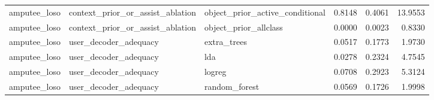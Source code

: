 \begin{table}[!t]
\begin{tabular}{lllrrr}
amputee\_loso & context\_prior\_or\_assist\_ablation & object\_prior\_active\_conditional & 0.8148 & 0.4061 & 13.9553 \\
amputee\_loso & context\_prior\_or\_assist\_ablation & object\_prior\_allclass & 0.0000 & 0.0023 & 0.8330 \\
amputee\_loso & user\_decoder\_adequacy & extra\_trees & 0.0517 & 0.1773 & 1.9730 \\
amputee\_loso & user\_decoder\_adequacy & lda & 0.0278 & 0.2324 & 4.7545 \\
amputee\_loso & user\_decoder\_adequacy & logreg & 0.0708 & 0.2923 & 5.3124 \\
amputee\_loso & user\_decoder\_adequacy & random\_forest & 0.0569 & 0.1726 & 1.9998 \\
\bottomrule
\end{tabular}
\end{table}
